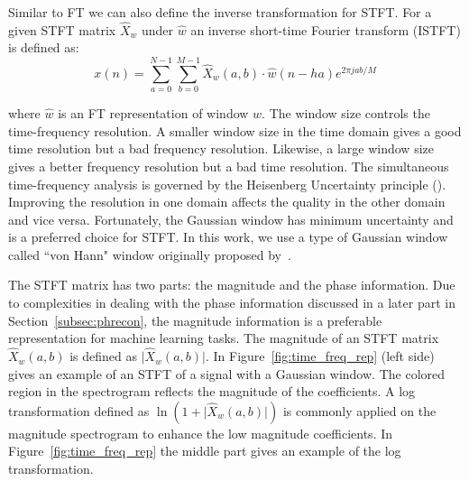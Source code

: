 Similar to FT we can also define the inverse transformation for STFT. For a given STFT matrix $\hat{X}_w$ under $\hat{w}$ an inverse short-time Fourier transform (ISTFT) is defined as:
\begin{equation}
    x(n) = \sum_{a=0}^{N-1} \sum_{b=0}^{M-1} \hat{X}_w(a,b)\cdot\hat{w}(n-ha)e^{2\pi jab/M}
\end{equation}

where $\hat{w}$ is an FT representation of window $w$. The window size controls the time-frequency resolution. A smaller window size in the time domain gives a good time resolution but a bad frequency resolution. Likewise, a large window size gives a better frequency resolution but a bad time resolution. The simultaneous time-frequency analysis is governed by the Heisenberg Uncertainty principle (\cite{gabor1946theory}). Improving the resolution in one domain affects the quality in the other domain and vice versa. Fortunately, the Gaussian window has minimum uncertainty and is a preferred choice for STFT. In this work, we use a type of Gaussian window called ``von Hann" window originally proposed by~\citet{harris1978use}. 

The STFT matrix has two parts: the magnitude and the phase information. Due to complexities in dealing with the phase information discussed in a later part in Section~\ref{subsec:phrecon}, the magnitude information is a preferable representation for machine learning tasks. The magnitude of an STFT matrix $\hat{X}_w(a,b)$ is defined as $\mathopen|\hat{X}_w(a,b)\mathclose|$.
In Figure~\ref{fig:time_freq_rep} (left side) gives an example of an STFT of a signal with a Gaussian window. The colored region in the spectrogram reflects the magnitude of the coefficients. A log transformation defined as $\ln(1+\mathopen|\hat{X}_w(a,b)\mathclose|)$ is commonly applied on the magnitude spectrogram to enhance the low magnitude coefficients. In Figure~\ref{fig:time_freq_rep} the middle part gives an example of the log transformation.


